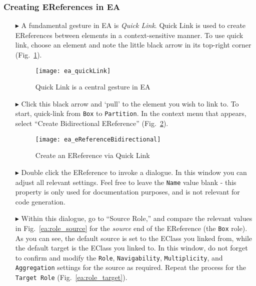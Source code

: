 \newpage
\subsubsection{Creating EReferences in EA}
\visHeader
\hypertarget{static:references vis}{}

\begin{itemize}

\item[$\blacktriangleright$] A fundamental gesture in EA is \emph{Quick Link}. Quick Link is used to create EReferences between elements in a context-sensitive
manner. To use quick link, choose an element and note the little black arrow in its top-right corner (Fig.~\ref{ea:quicklink}).

\begin{figure}[htbp]
	\centering
  \texttt{[image: ea\_quickLink]}
	\caption{Quick Link is a central gesture in EA}
	\label{ea:quicklink}
\end{figure}
\FloatBarrier

\item[$\blacktriangleright$] Click this black arrow and `pull' to the element you wish to link to. To start, quick-link from \texttt{Box} to \texttt{Partition}.
In the context menu that appears, select ``Create Bidirectional EReference'' (Fig.~\ref{ea:ereference}).

\begin{figure}[htbp]
	\centering
  \texttt{[image: ea\_eReferenceBidirectional]}
	\caption{Create an EReference via Quick Link}
	\label{ea:ereference}
\end{figure}
\FloatBarrier

\item[$\blacktriangleright$] Double click the EReference to invoke a dialogue. In this window you can adjust all relevant settings. Feel free to leave the
\texttt{Name} value blank - this property is only used for documentation purposes, and is not relevant for code generation.

\item[$\blacktriangleright$] Within this dialogue, go to ``Source Role,'' and compare the relevant values in Fig.~\ref{ea:role_source} for the \emph{source}
end of the EReference (the \texttt{Box} role). As you can see, the default source is set to the EClass you linked from, while the default target
is the EClass you linked to. In this window, do not forget to confirm and modify the \texttt{Role}, \texttt{Navigability}, \texttt{Multiplicity}, and
\texttt{Aggregation} settings for the source as required. Repeat the process for the \texttt{Target Role} (Fig.~\ref{ea:role_target}).


\end{itemize}

